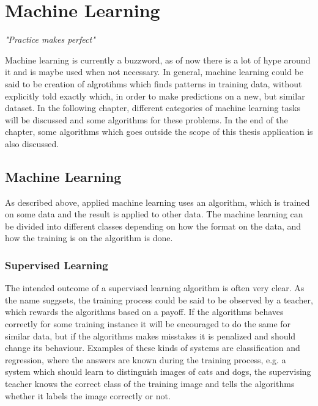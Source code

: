 \chapter{Machine Learning}
\begin{center}
\vspace{-6ex}
\textit{"Practice makes perfect"}
\vspace{6ex}
\end{center}

Machine learning is currently a buzzword, as of now there is a lot of hype around it and is maybe used when not necessary. In general, machine learning could be said to be creation of algrotihms which finds patterns in training data, without explicitly told exactly which, in order to make predictions on a new, but similar dataset. In the following chapter, different categories of machine learning tasks will be discussed and some algorithms for these problems. In the end of the chapter, some algorithms which goes outside the scope of this thesis application is also discussed.



\section{Machine Learning}

As described above, applied machine learning uses an algorithm, which is trained on some data and the result is applied to other data. The machine learning can be divided into different classes depending on how the format on the data, and how the training is on the algorithm is done.

\subsection{Supervised Learning}

The intended outcome of a supervised learning algorithm is often very clear. As the name suggsets, the training process could be said to be observed by a teacher, which rewards the algorithms based on a payoff. If the algorithms behaves correctly for some training instance it will be encouraged to do the same for similar data, but if the algorithms makes misstakes it is penalized and should change its behaviour. Examples of these kinds of systems are classification and regression, where the answers are known during the training process, e.g. a system which should learn to distinguish images of cats and dogs, the supervising teacher knows the correct class of the training image and tells the algorithms whether it labels the image correctly or not.

